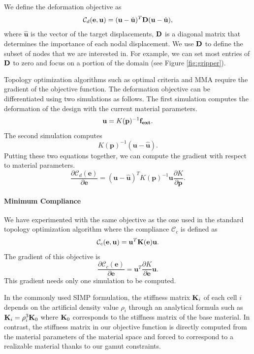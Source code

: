 We define the deformation objective as
\begin{equation}
\mathcal{C}_d(\mathbf{e},\mathbf{u})=(\mathbf{u}-\hat{\mathbf{u}})^T \mathbf{D} (\mathbf{u}-\hat{\mathbf{u}}),\label{eq:td}
\end{equation}
where $\hat{\mathbf{u}}$ is the vector of the target displacements, $\bf D$ is a diagonal matrix that determines the importance of each nodal displacement.	
We use $\bf D$ to define the subset of nodes that we are interested in.
For example, we can set most entries of $\bf D$ to zero and focus on a portion of the domain (see Figure \ref{fig:gripper}).

Topology optimization algorithms such as optimal criteria and MMA require the gradient of the objective function.
The deformation objective can be differentiated using two simulations as follows.
The first simulation computes the deformation of the design with the current material parameters.
\[
\mathbf{u} = K(\mathbf{p})^{-1}\bf f_{ext}.
\]
The second simulation computes
\[
K(\mathbf{p})^{-1}(\mathbf{u}-\hat{\mathbf{u}}).
\]
Putting these two equations together, we can compute the gradient with respect to material parameters.
\[\frac{\partial \mathcal{C}_d(\mathbf{e})}{\partial \mathbf{e}}
=(\mathbf{u}-\hat{\mathbf{u}})^{T}K(\mathbf{p})^{-1}\mathbf{u}\frac{\partial K}{\partial \mathbf{p}}.
\]
\paragraph{Minimum Compliance}\label{sec:compliance}
We have experimented with the same objective as the one used in the standard topology optimization algorithm where the compliance $\mathcal{C}_c$ is defined as
\begin{equation}
\mathcal{C}_c(\mathbf{e},\mathbf{u})=\mathbf{u}^T \mathbf{K}(\mathbf{e}) \mathbf{u}.
\label{eq:mc}
\end{equation}
The gradient of this objective is
\[
\frac{\partial \mathcal{C}_c(\mathbf{e})}{\partial \mathbf{e}}
=\mathbf{u}^T\frac{\partial K}{\partial \mathbf{e}}\mathbf{u}.
\]
This gradient needs only one simulation to be computed.

In the commonly used SIMP formulation, the stiffness matrix $\mathbf{K}_i$ of each cell $i$ depends on the artificial density value $\rho_i$
through an analytical formula such as $\mathbf{K}_i = \rho_i^3\mathbf{K}_0$ where $\mathbf{K}_0$ corresponds to the stiffness matrix of the base material.
In contrast, the stiffness matrix in our objective function is directly computed from the material parameters of the material space and forced to correspond to a realizable material thanks to our gamut constraints.

